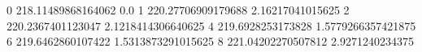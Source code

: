 0 218.11489868164062 0.0
1 220.27706909179688 2.16217041015625
2 220.2367401123047 2.1218414306640625
4 219.6928253173828 1.5779266357421875
6 219.6462860107422 1.5313873291015625
8 221.04202270507812 2.9271240234375
